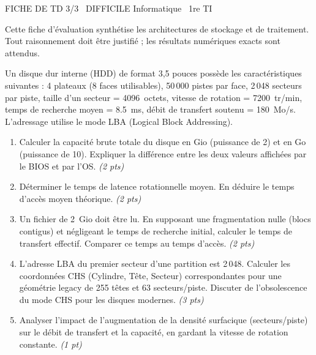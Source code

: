 \documentclass[11pt]{article}
\begin{document}
\begin{tcolorbox}[enhanced,colback=popink,colframe=popink,arc=10pt,boxrule=0pt,left=12pt,right=12pt,top=9pt,bottom=9pt]
{\color{white}\popxbold\small FICHE DE TD 3/3 \textbullet\ DIFFICILE \hfill Informatique \textbullet\ 1re TI\par}
\end{tcolorbox}
\vspace{4pt}
Cette fiche d'évaluation synthétise les architectures de stockage et de traitement. Tout raisonnement doit être justifié ; les résultats numériques exacts sont attendus.

\begin{exercice}
Un disque dur interne (HDD) de format 3,5 pouces possède les caractéristiques suivantes : 4 plateaux (8 faces utilisables), 50\,000 pistes par face, 2\,048 secteurs par piste, taille d'un secteur = \SI{4096}{octets}, vitesse de rotation = \SI{7200}{tr/min}, temps de recherche moyen = \SI{8,5}{ms}, débit de transfert soutenu = \SI{180}{Mo/s}. L'adressage utilise le mode LBA (Logical Block Addressing).
\begin{enumerate}
    \item Calculer la capacité brute totale du disque en Gio (puissance de 2) et en Go (puissance de 10). Expliquer la différence entre les deux valeurs affichées par le BIOS et par l'OS. \textit{(2 pts)}
    \item Déterminer le temps de latence rotationnelle moyen. En déduire le temps d'accès moyen théorique. \textit{(2 pts)}
    \item Un fichier de \SI{2}{Gio} doit être lu. En supposant une fragmentation nulle (blocs contigus) et négligeant le temps de recherche initial, calculer le temps de transfert effectif. Comparer ce temps au temps d'accès. \textit{(2 pts)}
    \item L'adresse LBA du premier secteur d'une partition est 2\,048. Calculer les coordonnées CHS (Cylindre, Tête, Secteur) correspondantes pour une géométrie legacy de 255 têtes et 63 secteurs/piste. Discuter de l'obsolescence du mode CHS pour les disques modernes. \textit{(3 pts)}
    \item Analyser l'impact de l'augmentation de la densité surfacique (secteurs/piste) sur le débit de transfert et la capacité, en gardant la vitesse de rotation constante. \textit{(1 pt)}
\end{enumerate}
\end{exercice}
\end{document}
